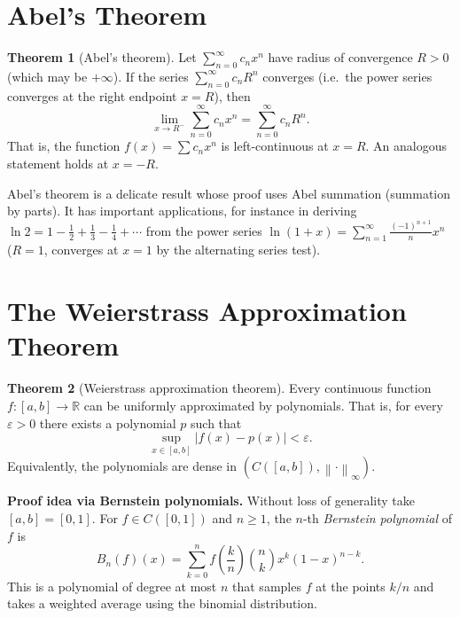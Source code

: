 \documentclass[12pt,a4paper]{book}
\theoremstyle{definition}
\newtheorem{theorem}{Theorem}[chapter]
\newcommand{\R}{\mathbb{R}}
\newcommand{\eps}{\varepsilon}
\newcommand{\abs}[1]{\left\lvert #1 \right\rvert}
\newcommand{\norm}[1]{\left\lVert #1 \right\rVert}
\begin{document}
\section{Abel's Theorem}\label{sec:abel}

\begin{theorem}[Abel's theorem]\label{thm:abel}
  Let $\sum_{n=0}^{\infty}c_n x^n$ have radius of convergence $R>0$
  (which may be $+\infty$).  If the series $\sum_{n=0}^{\infty}c_n R^n$
  converges (i.e.\ the power series converges at the right endpoint $x=R$),
  then
  \[
    \lim_{x\to R^-}\sum_{n=0}^{\infty}c_n x^n
    = \sum_{n=0}^{\infty}c_n R^n.
  \]
  That is, the function $f(x)=\sum c_n x^n$ is left-continuous at $x=R$.
  An analogous statement holds at $x=-R$.
\end{theorem}

Abel's theorem is a delicate result whose proof uses Abel summation
(summation by parts).  It has important applications, for instance in
deriving
$\ln 2 = 1-\frac{1}{2}+\frac{1}{3}-\frac{1}{4}+\cdots$ from the power
series $\ln(1+x)=\sum_{n=1}^{\infty}\frac{(-1)^{n+1}}{n}x^n$
($R=1$, converges at $x=1$ by the alternating series test).



\section{The Weierstrass Approximation Theorem}\label{sec:weierstrass-approx}

\begin{theorem}[Weierstrass approximation theorem]\label{thm:weierstrass-approx}
  Every continuous function $f\colon[a,b]\to\R$ can be uniformly
  approximated by polynomials.  That is, for every $\eps>0$ there exists
  a polynomial $p$ such that
  \[
    \sup_{x\in[a,b]}\abs{f(x)-p(x)} < \eps.
  \]
  Equivalently, the polynomials are dense in $(C([a,b]),\norm{\cdot}_\infty)$.
\end{theorem}

\noindent\textbf{Proof idea via Bernstein polynomials.}\;
Without loss of generality take $[a,b]=[0,1]$.  For $f\in C([0,1])$
and $n\ge1$, the $n$-th \emph{Bernstein polynomial} of $f$ is
\[
  B_n(f)(x) = \sum_{k=0}^n f\!\left(\frac{k}{n}\right)\binom{n}{k}
  x^k(1-x)^{n-k}.
\]
This is a polynomial of degree at most $n$ that samples $f$ at the
points $k/n$ and takes a weighted average using the binomial
distribution.
\end{document}
